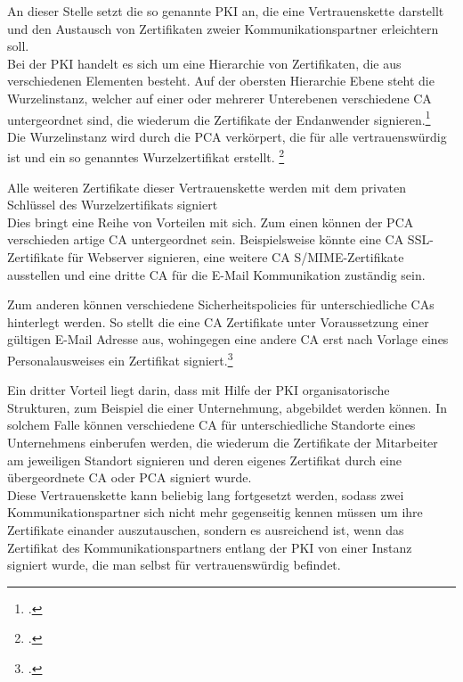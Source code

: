 \documentclass  [paper=a4,
				fontsize=12pt,
				listof=totoc,
				bibliography=totoc
				]{scrreprt}
\begin{document}
			An dieser Stelle setzt die so genannte \ac{PKI} an, die eine Vertrauenskette darstellt und den Austausch von Zertifikaten zweier Kommunikationspartner erleichtern soll.
			\medskip\\
					
			Bei der \ac{PKI} handelt es sich um eine Hierarchie von Zertifikaten, die aus verschiedenen Elementen besteht. Auf der obersten Hierarchie Ebene steht die Wurzelinstanz, welcher auf einer oder mehrerer Unterebenen verschiedene \ac{CA} untergeordnet sind, die wiederum die Zertifikate der Endanwender signieren.\footcite[Vgl.][S. 23]{Schwenk}\medskip\\
			
			Die Wurzelinstanz wird durch die \ac{PCA} verkörpert, die  für alle vertrauenswürdig ist und ein so genanntes Wurzelzertifikat erstellt. \footcite[Vgl. ][]{ITWissen2012} 
			
			Alle weiteren Zertifikate dieser Vertrauenskette werden mit dem privaten Schlüssel des Wurzelzertifikats signiert %
			\medskip\\
						
			Dies bringt eine Reihe von Vorteilen mit sich. Zum einen können der \ac{PCA} verschieden artige \ac{CA} untergeordnet sein. Beispielsweise könnte eine \ac{CA} SSL-Zertifikate für Webserver signieren, eine weitere \ac{CA} \ac{S/MIME}-Zertifikate ausstellen und eine dritte \ac{CA} für die E-Mail Kommunikation zuständig sein.
			
			Zum anderen können verschiedene Sicherheitspolicies für unterschiedliche \acp{CA} hinterlegt werden. So stellt die eine \ac{CA} Zertifikate unter Voraussetzung einer gültigen E-Mail Adresse aus, wohingegen eine andere \ac{CA} erst nach Vorlage eines Personalausweises ein Zertifikat signiert.\footcite[Vgl.][S. 24]{Schwenk}
			
			Ein dritter Vorteil liegt darin, dass mit Hilfe der \ac{PKI} organisatorische Strukturen, zum Beispiel die einer Unternehmung, abgebildet werden können. In solchem Falle können verschiedene CA für unterschiedliche Standorte eines Unternehmens einberufen werden, die wiederum die Zertifikate der Mitarbeiter am jeweiligen Standort signieren und deren eigenes Zertifikat durch eine übergeordnete \ac{CA} oder \ac{PCA} signiert wurde.\medskip\\
			
			Diese Vertrauenskette kann beliebig lang fortgesetzt werden, sodass zwei Kommunikationspartner sich nicht mehr gegenseitig kennen müssen um ihre Zertifikate einander auszutauschen, sondern es ausreichend ist, wenn das Zertifikat des Kommunikationspartners entlang der \ac{PKI} von einer Instanz signiert wurde, die man selbst für vertrauenswürdig befindet.\medskip\\
			
\end{document}
